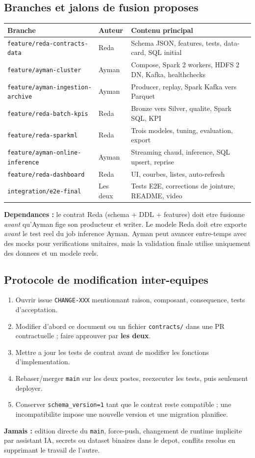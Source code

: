 \documentclass[10pt,a4paper]{article}
\newcommand{\code}[1]{{\small\ttfamily\nolinkurl{#1}}}
\begin{document}
\subsection{Branches et jalons de fusion proposes}
\begin{tabularx}{\linewidth}{@{}p{50mm}p{23mm}Y@{}}
\toprule
\textbf{Branche} & \textbf{Auteur} & \textbf{Contenu principal}\\\midrule
\code{feature/reda-contracts-data} & Reda & Schema JSON, features, tests, data-card, SQL initial\\
\code{feature/ayman-cluster} & Ayman & Compose, Spark 2 workers, HDFS 2 DN, Kafka, healthchecks\\
\code{feature/ayman-ingestion-archive} & Ayman & Producer, replay, Spark Kafka vers Parquet\\
\code{feature/reda-batch-kpis} & Reda & Bronze vers Silver, qualite, Spark SQL, KPI\\
\code{feature/reda-sparkml} & Reda & Trois modeles, tuning, evaluation, export\\
\code{feature/ayman-online-inference} & Ayman & Streaming chaud, inference, SQL upsert, reprise\\
\code{feature/reda-dashboard} & Reda & UI, courbes, listes, auto-refresh\\
\code{integration/e2e-final} & Les deux & Tests E2E, corrections de jointure, README, video\\
\bottomrule
\end{tabularx}
\textbf{Dependances :} le contrat Reda (schema + DDL + features) doit etre fusionne \emph{avant} qu'Ayman fige son producteur et writer. Le modele Reda doit etre exporte \emph{avant} le test reel du job inference Ayman. Ayman peut avancer entre-temps avec des mocks pour verifications unitaires, mais la validation finale utilise uniquement des donnees et un modele reels.

\subsection{Protocole de modification inter-equipes}
\begin{enumerate}
\item Ouvrir issue \code{CHANGE-XXX} mentionnant raison, composant, consequence, tests d'acceptation.
\item Modifier d'abord ce document ou un fichier \code{contracts/} dans une PR contractuelle ; faire approuver par \textbf{les deux}.
\item Mettre a jour les tests de contrat avant de modifier les fonctions d'implementation.
\item Rebaser/merger \code{main} sur les deux postes, reexecuter les tests, puis seulement deployer.
\item Conserver \code{schema_version=1} tant que le contrat reste compatible ; une incompatibilite impose une nouvelle version et une migration planifiee.
\end{enumerate}
\textbf{Jamais :} edition directe du \code{main}, force-push, changement de runtime implicite par assistant IA, secrets ou dataset binaires dans le depot, conflits resolus en supprimant le travail de l'autre.
\end{document}
